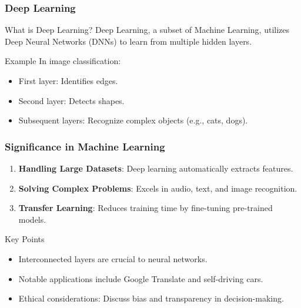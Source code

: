 \documentclass[aspectratio=169]{beamer}
\begin{document}
\begin{frame}[fragile]
    \frametitle{Deep Learning}
    \begin{block}{What is Deep Learning?}
        Deep Learning, a subset of Machine Learning, utilizes Deep Neural Networks (DNNs) to learn from multiple hidden layers.
    \end{block}

    \begin{block}{Example}
        In image classification:
        \begin{itemize}
            \item First layer: Identifies edges.
            \item Second layer: Detects shapes.
            \item Subsequent layers: Recognize complex objects (e.g., cats, dogs).
        \end{itemize}
    \end{block}
\end{frame}

\begin{frame}[fragile]
    \frametitle{Significance in Machine Learning}
    \begin{enumerate}
        \item \textbf{Handling Large Datasets}: Deep learning automatically extracts features.
        \item \textbf{Solving Complex Problems}: Excels in audio, text, and image recognition.
        \item \textbf{Transfer Learning}: Reduces training time by fine-tuning pre-trained models.
    \end{enumerate}
    
    \begin{block}{Key Points}
        \begin{itemize}
            \item Interconnected layers are crucial to neural networks.
            \item Notable applications include Google Translate and self-driving cars.
            \item Ethical considerations: Discuss bias and transparency in decision-making.
        \end{itemize}
    \end{block}
\end{frame}
\end{document}
